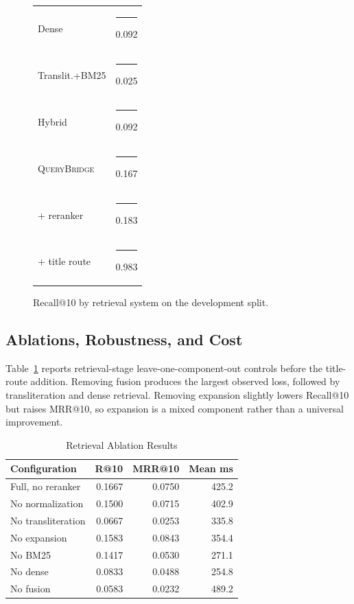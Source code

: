 \documentclass[conference]{IEEEtran}
\newcommand{\querybridge}{\textsc{QueryBridge}}
\begin{document}
\begin{figure}[t]
\centering
\footnotesize
\begin{tabular}{@{}l@{\hspace{2mm}}l@{}}
Dense & \textcolor{raabta}{\rule{0.46cm}{1.35ex}} 0.092 \\
Translit.+BM25 & \textcolor{raabta}{\rule{0.13cm}{1.35ex}} 0.025 \\
Hybrid & \textcolor{raabta}{\rule{0.46cm}{1.35ex}} 0.092 \\
\querybridge & \textcolor{raabta}{\rule{0.84cm}{1.35ex}} 0.167 \\
+ reranker & \textcolor{raabta}{\rule{0.92cm}{1.35ex}} 0.183 \\
+ title route & \textcolor{raabta}{\rule{4.92cm}{1.35ex}} 0.983 \\
\end{tabular}
\caption{Recall@10 by retrieval system on the development split.}
\label{fig:bars}
\end{figure}

\subsection{Ablations, Robustness, and Cost}
Table~\ref{tab:ablation} reports retrieval-stage leave-one-component-out controls before the title-route addition. Removing fusion produces the largest observed loss, followed by transliteration and dense retrieval. Removing expansion slightly lowers Recall@10 but raises MRR@10, so expansion is a mixed component rather than a universal improvement.

\begin{table}[t]
\caption{Retrieval Ablation Results}
\label{tab:ablation}
\centering
\small
\begin{tabular}{@{}lrrr@{}}
\toprule
Configuration & R@10 & MRR@10 & Mean ms \\
\midrule
Full, no reranker & 0.1667 & 0.0750 & 425.2 \\
No normalization & 0.1500 & 0.0715 & 402.9 \\
No transliteration & 0.0667 & 0.0253 & 335.8 \\
No expansion & 0.1583 & 0.0843 & 354.4 \\
No BM25 & 0.1417 & 0.0530 & 271.1 \\
No dense & 0.0833 & 0.0488 & 254.8 \\
No fusion & 0.0583 & 0.0232 & 489.2 \\
\bottomrule
\end{tabular}
\end{table}
\end{document}
